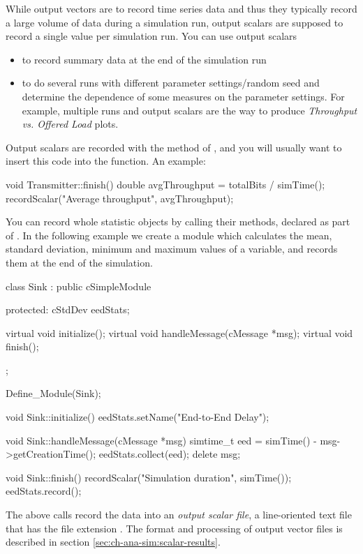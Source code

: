While output vectors are to record time series data and thus they
typically record a large volume of data during a simulation run,
output scalars are supposed to record a single
value per simulation run. You can use output scalars

\begin{itemize}
\item{to record summary data at the end of the simulation run}
\item{to do several runs with different parameter settings/random seed
    and determine the dependence of some measures on the parameter
    settings. For example, multiple runs and output scalars are the
    way to produce \textit{Throughput vs. Offered Load} plots.}
\end{itemize}

Output scalars are recorded with the  method of
, and you will usually want to insert this code
into the  function. An example:

\begin{cpp}
void Transmitter::finish()
{
    double avgThroughput = totalBits / simTime();
    recordScalar("Average throughput", avgThroughput);
}
\end{cpp}

You can record whole statistic objects by calling their 
methods, declared as part of . In the following example
we create a  module which calculates the mean, standard
deviation, minimum and maximum values of a variable, and records them at the
end of the simulation.

\begin{cpp}
class Sink : public cSimpleModule
{
  protected:
    cStdDev eedStats;

    virtual void initialize();
    virtual void handleMessage(cMessage *msg);
    virtual void finish();
};

Define_Module(Sink);

void Sink::initialize()
{
    eedStats.setName("End-to-End Delay");
}

void Sink::handleMessage(cMessage *msg)
{
    simtime_t eed = simTime() - msg->getCreationTime();
    eedStats.collect(eed);
    delete msg;
}

void Sink::finish()
{
    recordScalar("Simulation duration", simTime());
    eedStats.record();
}
\end{cpp}

The above calls record the data into an \textit{output scalar file},
a line-oriented text file that has the file extension .
The format and processing of output vector files is described in section
\ref{sec:ch-ana-sim:scalar-results}.



